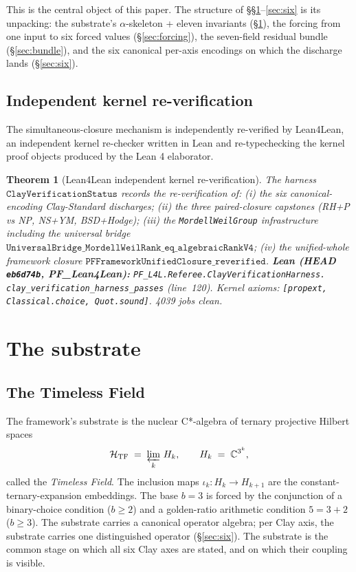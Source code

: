 \documentclass[11pt,a4paper]{article}
\theoremstyle{plain}
\newtheorem{theorem}{Theorem}[section]
\theoremstyle{definition}
\begin{document}
This is the central object of this paper. The structure of
\S\S\ref{sec:substrate}--\ref{sec:six} is its unpacking: the
substrate's $\alpha$-skeleton + eleven invariants
(\S\ref{sec:substrate}), the forcing from one input to six
forced values (\S\ref{sec:forcing}), the seven-field residual
bundle (\S\ref{sec:bundle}), and the six canonical
per-axis encodings on which the discharge lands
(\S\ref{sec:six}).

\subsection{Independent kernel re-verification}
\label{sec:l4l-anchor}

The simultaneous-closure mechanism is independently
re-verified by Lean4Lean, an independent kernel re-checker
written in Lean and re-typechecking the kernel proof
objects produced by the Lean 4 elaborator.

\begin{theorem}[Lean4Lean independent kernel re-verification]
\label{thm:l4l}
The harness $\mathtt{ClayVerificationStatus}$ records the
re-verification of: (i) the six canonical-encoding
Clay-Standard discharges; (ii) the three paired-closure
capstones (RH+P vs NP, NS+YM, BSD+Hodge); (iii) the
\texttt{MordellWeilGroup} infrastructure including the universal
bridge $\mathtt{UniversalBridge\_MordellWeilRank\_eq\_algebraicRankV4}$;
(iv) the unified-whole framework closure
$\mathtt{PFFrameworkUnifiedClosure\_reverified}$.
\textbf{Lean (HEAD \texttt{eb6d74b}, PF\_Lean4Lean):}
\texttt{PF\_L4L.Referee.ClayVerificationHarness.\\
clay\_verification\_harness\_passes}
(line~120). Kernel axioms:
\texttt{[propext, Classical.choice, Quot.sound]}.
4039 jobs clean.
\end{theorem}

\section{The substrate}
\label{sec:substrate}

\subsection{The Timeless Field}
\label{sec:tf}

The framework's substrate is the nuclear C*-algebra of ternary
projective Hilbert spaces
\[
\mathcal{H}_{\mathrm{TF}} \;=\; \varprojlim_{k}\, H_{k}, \qquad
H_{k} \;=\; \mathbb{C}^{3^{k}},
\]
called the \emph{Timeless Field}. The inclusion maps
$\iota_{k} : H_{k} \to H_{k+1}$ are the constant-ternary-expansion
embeddings. The base $b = 3$ is forced by the conjunction of a
binary-choice condition ($b \ge 2$) and a golden-ratio arithmetic
condition $5 = 3 + 2$ ($b \ge 3$). The substrate carries a
canonical operator algebra; per Clay axis, the substrate carries
one distinguished operator (\S\ref{sec:six}). The substrate is the
common stage on which all six Clay axes are stated, and on which
their coupling is visible.
\end{document}
